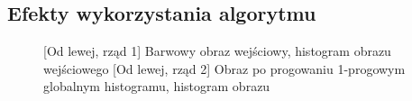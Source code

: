 \documentclass[a4paper,12pt, titlepage]{report}
\begin{document}
\subsection*{Efekty wykorzystania algorytmu}
\begin{figure}[h]
    \centering
    \qquad
    \caption{[Od lewej, rząd 1] Barwowy obraz wejściowy, histogram obrazu wejściowego [Od lewej, rząd 2] Obraz po progowaniu 1-progowym globalnym histogramu, histogram obrazu}%
    \label{fig:rysunek}%
\end{figure}
\end{document}
